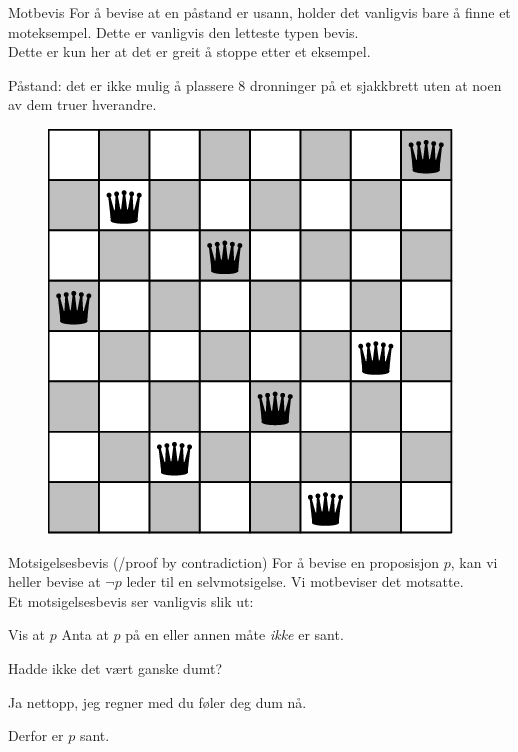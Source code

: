 \begin{frame}{Motbevis}
    For å bevise at en påstand er usann, holder det vanligvis bare å finne et moteksempel. Dette er vanligvis den letteste typen bevis.\\
    Dette er kun her at det er greit å stoppe etter et eksempel.
    \pause
    \begin{block}{Påstand: det er ikke mulig å plassere 8 dronninger på et sjakkbrett uten at noen av dem truer hverandre.}
    \pause
    \begin{figure}
        \centering
        \includegraphics[scale=0.20]{images/8 queens.png}
        \label{fig:my_label}
    \end{figure}
    
    \end{block}
\end{frame}

\begin{frame}{Motsigelsesbevis (/proof by contradiction)}
    For å bevise en proposisjon $p$, kan vi heller bevise at $\lnot p$ leder til en selvmotsigelse. 
    Vi motbeviser det motsatte.\\

    \pause
    Et motsigelsesbevis ser vanligvis slik ut:
    \begin{block}{Vis at $p$}
        Anta at $p$ på en eller annen måte \emph{ikke} er sant.

        \pause
        Hadde ikke det vært ganske dumt?

        \pause
        Ja nettopp, jeg regner med du føler deg dum nå.

        \pause
        Derfor er $p$ sant.
    \end{block}
\end{frame}

